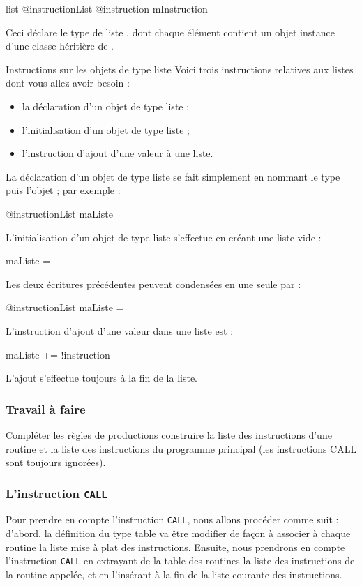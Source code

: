 \begin{galgascode}
list @instructionList {
  @instruction mInstruction
}
\end{galgascode}

Ceci déclare le type de liste , dont chaque élément contient un objet instance d'une classe héritière de .

Instructions sur les objets de type liste
Voici trois instructions relatives aux listes dont vous allez avoir besoin :
\begin{itemize}
  \item la déclaration d'un objet de type liste ;
  \item l'initialisation d'un objet de type liste ;
  \item l'instruction d'ajout d'une valeur à une liste.
\end{itemize}

La déclaration d'un objet de type liste se fait simplement en nommant le type puis l'objet ; par exemple :
\begin{galgascode}
@instructionList maListe
\end{galgascode}

L'initialisation d'un objet de type liste s'effectue en créant une liste vide :
\begin{galgascode}
maListe = {}
\end{galgascode}

Les deux écritures précédentes peuvent condensées en une seule par :
\begin{galgascode}
@instructionList maListe = {}
\end{galgascode}

L'instruction d'ajout d'une valeur dans une liste est :
\begin{galgascode}
maListe += !instruction
\end{galgascode}
L'ajout s'effectue toujours à la fin de la liste.

\subsubsection{Travail à faire}
Compléter les règles de productions construire la liste des instructions d'une routine et la liste des instructions du programme principal (les instructions CALL sont toujours ignorées).

\subsubsection{L'instruction \texttt{CALL}}
Pour prendre en compte l’instruction \texttt{CALL}, nous allons procéder comme suit : d’abord, la définition du type table  va être modifier de façon à associer à chaque routine la liste mise à plat des instructions. Ensuite, nous prendrons en compte l’instruction \texttt{CALL} en extrayant de la table des routines la liste des instructions de la routine appelée, et en l’insérant à la fin de la liste courante des instructions.

